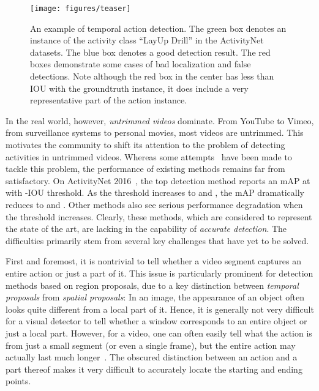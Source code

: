 \documentclass[10pt,twocolumn,letterpaper]{article}
\begin{document}
 
\begin{figure}
\centering
\texttt{[image: figures/teaser]}
\caption{An example of temporal action detection. The green box denotes an instance of the activity class ``LayUp Drill'' in the ActivityNet~\cite{caba2015activitynet} datasets.
	The blue box denotes a good detection result. The red boxes demonstrate some cases of bad localization and false detections.
	Note although the red box in the center has less than   IOU with the groundtruth instance, it does include a very representative part of the action instance.}
\label{fig:teaser}
\end{figure}

In the real world, however, \emph{untrimmed videos} dominate. 
From YouTube to Vimeo, from surveillance systems to personal movies, 
most videos are untrimmed. 
This motivates the community to shift its attention to the problem
of detecting activities in untrimmed videos.
Whereas some attempts~\cite{Yeung2016FrameGlimpse,Yuan2016ScorePyramids}
have been made to tackle this problem, 
the performance of existing methods remains far from satisfactory. 
On ActivityNet 2016~\cite{caba2015activitynet}, the top detection method
reports an mAP at  with -IOU threshold.
As the threshold increases to  and , the mAP dramatically
reduces to  and . 
Other methods also see serious performance degradation when the threshold increases.
Clearly, these methods, which are considered to represent
the state of the art, are lacking in the capability of \emph{accurate detection}. 
The difficulties primarily stem from several key challenges
that have yet to be solved. 

First and foremost, it is nontrivial to tell whether a video segment
captures an entire action or just a part of it.  
This issue is particularly prominent for detection methods based on region proposals,
due to a key distinction between \emph{temporal proposals} from \emph{spatial proposals}:
In an image, the appearance of an object often looks quite different 
from a local part of it. Hence, it is generally not very difficult for a visual detector
to tell whether a window corresponds to an entire object or just a local part. 
However, for a video, one can often easily tell what the action is from just a small segment
(or even a single frame), but the entire action may actually last much longer~\cite{Schindler2008Snippet}. 
The obscured distinction between an action and a part thereof makes it very difficult to 
accurately locate the starting and ending points. 
\end{document}

